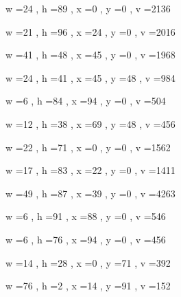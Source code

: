 \documentclass[11pt]{article}
\begin{document}
w =24 , h =89 , x =0 , y =0 , v =2136
\par
w =21 , h =96 , x =24 , y =0 , v =2016
\par
w =41 , h =48 , x =45 , y =0 , v =1968
\par
w =24 , h =41 , x =45 , y =48 , v =984
\par
w =6 , h =84 , x =94 , y =0 , v =504
\par
w =12 , h =38 , x =69 , y =48 , v =456
\par
\newpage




w =22 , h =71 , x =0 , y =0 , v =1562
\par
w =17 , h =83 , x =22 , y =0 , v =1411
\par
w =49 , h =87 , x =39 , y =0 , v =4263
\par
w =6 , h =91 , x =88 , y =0 , v =546
\par
w =6 , h =76 , x =94 , y =0 , v =456
\par
w =14 , h =28 , x =0 , y =71 , v =392
\par
w =76 , h =2 , x =14 , y =91 , v =152
\par
\newpage
\end{document}
